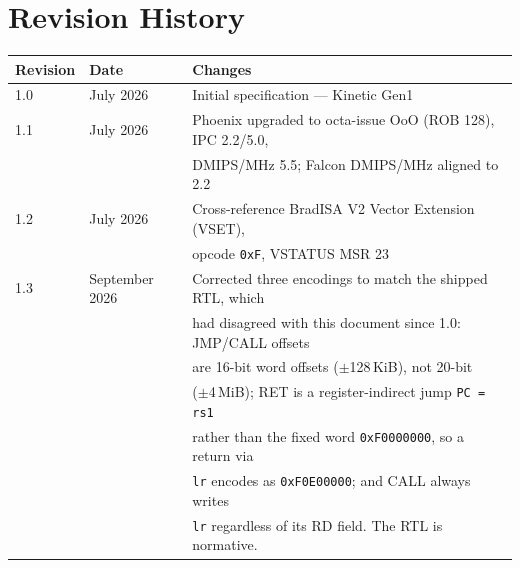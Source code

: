 \documentclass[11pt,a4paper]{article}
\begin{document}
\newpage

\section*{Revision History}
\begin{tabular}{lll}
\toprule
Revision & Date & Changes \\
\midrule
1.0 & July 2026 & Initial specification --- Kinetic Gen1 \\
1.1 & July 2026 & Phoenix upgraded to octa-issue OoO (ROB 128), IPC 2.2/5.0, \\
    &           & DMIPS/MHz 5.5; Falcon DMIPS/MHz aligned to 2.2 \\
1.2 & July 2026 & Cross-reference BradISA V2 Vector Extension (VSET), \\
    &           & opcode {\tt 0xF}, VSTATUS MSR 23 \\
1.3 & September 2026 & Corrected three encodings to match the shipped RTL, which \\
    &           & had disagreed with this document since 1.0: JMP/CALL offsets \\
    &           & are 16-bit word offsets ($\pm$128\,KiB), not 20-bit \\
    &           & ($\pm$4\,MiB); RET is a register-indirect jump {\tt PC = rs1} \\
    &           & rather than the fixed word {\tt 0xF0000000}, so a return via \\
    &           & {\tt lr} encodes as {\tt 0xF0E00000}; and CALL always writes \\
    &           & {\tt lr} regardless of its RD field. The RTL is normative. \\
\bottomrule
\end{tabular}
\end{document}

